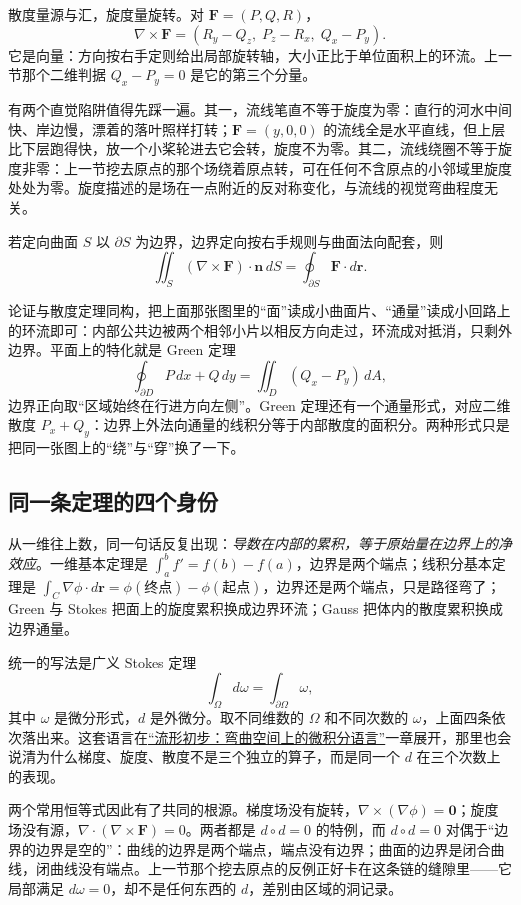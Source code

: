 散度量源与汇，旋度量旋转。对 \(\mathbf F=(P,Q,R)\)，
\[
\nabla\times\mathbf F=(R_y-Q_z,\;P_z-R_x,\;Q_x-P_y).
\]
它是向量：方向按右手定则给出局部旋转轴，大小正比于单位面积上的环流。上一节那个二维判据 \(Q_x-P_y=0\) 是它的第三个分量。

有两个直觉陷阱值得先踩一遍。其一，流线笔直不等于旋度为零：直行的河水中间快、岸边慢，漂着的落叶照样打转；\(\mathbf F=(y,0,0)\) 的流线全是水平直线，但上层比下层跑得快，放一个小桨轮进去它会转，旋度不为零。其二，流线绕圈不等于旋度非零：上一节挖去原点的那个场绕着原点转，可在任何不含原点的小邻域里旋度处处为零。旋度描述的是场在一点附近的反对称变化，与流线的视觉弯曲程度无关。

\begin{theorem}[Stokes 定理]
若定向曲面 \(S\) 以 \(\partial S\) 为边界，边界定向按右手规则与曲面法向配套，则
\[
\iint_S(\nabla\times\mathbf F)\cdot\mathbf n\,dS=\oint_{\partial S}\mathbf F\cdot d\mathbf r .
\]
\end{theorem}

论证与散度定理同构，把上面那张图里的``面''读成小曲面片、``通量''读成小回路上的环流即可：内部公共边被两个相邻小片以相反方向走过，环流成对抵消，只剩外边界。平面上的特化就是 Green 定理
\[
\oint_{\partial D}P\,dx+Q\,dy=\iint_D(Q_x-P_y)\,dA,
\]
边界正向取``区域始终在行进方向左侧''。Green 定理还有一个通量形式，对应二维散度 \(P_x+Q_y\)：边界上外法向通量的线积分等于内部散度的面积分。两种形式只是把同一张图上的``绕''与``穿''换了一下。

\subsection{同一条定理的四个身份}

从一维往上数，同一句话反复出现：\emph{导数在内部的累积，等于原始量在边界上的净效应}。一维基本定理是 \(\int_a^b f'=f(b)-f(a)\)，边界是两个端点；线积分基本定理是 \(\int_C\nabla\phi\cdot d\mathbf r=\phi(\text{终点})-\phi(\text{起点})\)，边界还是两个端点，只是路径弯了；Green 与 Stokes 把面上的旋度累积换成边界环流；Gauss 把体内的散度累积换成边界通量。

统一的写法是广义 Stokes 定理
\[
\int_\Omega d\omega=\int_{\partial\Omega}\omega,
\]
其中 \(\omega\) 是微分形式，\(d\) 是外微分。取不同维数的 \(\Omega\) 和不同次数的 \(\omega\)，上面四条依次落出来。这套语言在\hyperref[ch:104]{``流形初步：弯曲空间上的微积分语言''}一章展开，那里也会说清为什么梯度、旋度、散度不是三个独立的算子，而是同一个 \(d\) 在三个次数上的表现。

两个常用恒等式因此有了共同的根源。梯度场没有旋转，\(\nabla\times(\nabla\phi)=\mathbf 0\)；旋度场没有源，\(\nabla\cdot(\nabla\times\mathbf F)=0\)。两者都是 \(d\circ d=0\) 的特例，而 \(d\circ d=0\) 对偶于``边界的边界是空的''：曲线的边界是两个端点，端点没有边界；曲面的边界是闭合曲线，闭曲线没有端点。上一节那个挖去原点的反例正好卡在这条链的缝隙里——它局部满足 \(d\omega=0\)，却不是任何东西的 \(d\)，差别由区域的洞记录。

